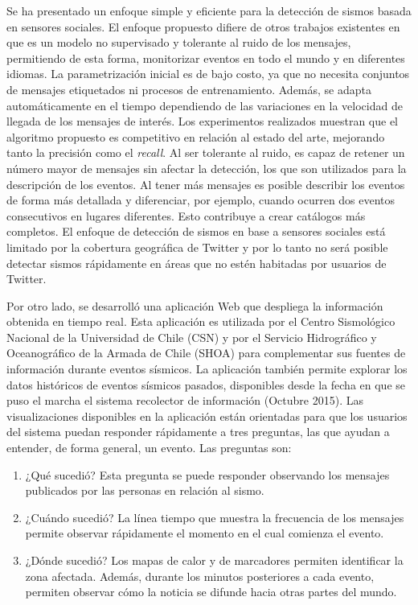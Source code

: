\begin{conclusion}
\label{cap:conclusion}	


Se ha presentado un enfoque simple y eficiente para la detección de sismos basada en sensores sociales. El enfoque propuesto difiere de otros trabajos existentes en que es un modelo no supervisado y tolerante al ruido de los mensajes, permitiendo de esta forma, monitorizar eventos en todo el mundo y en diferentes idiomas. La parametrización inicial es de bajo costo, ya que no necesita conjuntos de mensajes etiquetados ni procesos de entrenamiento. Además, se adapta automáticamente en el tiempo dependiendo de las variaciones en la velocidad de llegada de los mensajes de interés. Los experimentos realizados muestran que el algoritmo propuesto es competitivo en relación al estado del arte, mejorando tanto la precisión como el {\em recall}. Al ser tolerante al ruido, es capaz de retener un número mayor de mensajes sin afectar la detección, los que son utilizados para la descripción de los eventos. Al tener más mensajes es posible describir los eventos de forma más detallada y diferenciar, por ejemplo, cuando ocurren dos eventos consecutivos en lugares diferentes. Esto contribuye a crear catálogos más completos. El enfoque de detección de sismos en base a sensores sociales está limitado por la cobertura geográfica de Twitter y por lo tanto no será posible detectar sismos rápidamente en áreas que no estén habitadas por usuarios de Twitter. 

Por otro lado, se desarrolló una aplicación Web que despliega la información obtenida en tiempo real. Esta aplicación es utilizada por el Centro Sismológico Nacional de la Universidad de Chile (CSN) y por el Servicio Hidrográfico y Oceanográfico de la Armada de Chile (SHOA) para complementar sus fuentes de información durante eventos sísmicos. 
La aplicación también permite explorar los datos históricos de eventos sísmicos pasados, disponibles desde la fecha en que se puso el marcha el sistema recolector de información (Octubre 2015). Las visualizaciones disponibles en la aplicación están orientadas para que los usuarios del sistema puedan responder rápidamente a tres preguntas, las que ayudan a entender, de forma general, un evento. Las preguntas son: 
\begin{enumerate}
\item ¿Qué sucedió? Esta pregunta se puede responder observando los mensajes publicados por las personas en relación al sismo.
\item ¿Cuándo sucedió? La línea tiempo que muestra la frecuencia de los mensajes permite observar rápidamente el momento en el cual comienza el evento. 
\item ¿Dónde sucedió? Los mapas de calor y de marcadores permiten identificar la zona afectada. Además, durante los minutos posteriores a cada evento, permiten observar cómo la noticia se difunde hacia otras partes del mundo.
\end{enumerate} 


\end{conclusion}

